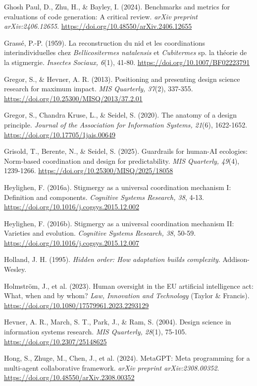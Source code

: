 Ghosh Paul, D., Zhu, H., \& Bayley, I. (2024). Benchmarks and metrics
for evaluations of code generation: A critical review. \emph{arXiv
preprint arXiv:2406.12655}.
\url{https://doi.org/10.48550/arXiv.2406.12655}

Grassé, P.-P. (1959). La reconstruction du nid et les coordinations
interindividuelles chez \emph{Bellicositermes natalensis} et
\emph{Cubitermes} sp. la théorie de la stigmergie. \emph{Insectes
Sociaux, 6}(1), 41-80. \url{https://doi.org/10.1007/BF02223791}

Gregor, S., \& Hevner, A. R. (2013). Positioning and presenting design
science research for maximum impact. \emph{MIS Quarterly, 37}(2),
337-355. \url{https://doi.org/10.25300/MISQ/2013/37.2.01}

Gregor, S., Chandra Kruse, L., \& Seidel, S. (2020). The anatomy of a
design principle. \emph{Journal of the Association for Information
Systems, 21}(6), 1622-1652.
\url{https://doi.org/10.17705/1jais.00649}

Grisold, T., Berente, N., \& Seidel, S. (2025). Guardrails for human-AI
ecologies: Norm-based coordination and design for predictability.
\emph{MIS Quarterly, 49}(4), 1239-1266.
\url{https://doi.org/10.25300/MISQ/2025/18058}

Heylighen, F. (2016a). Stigmergy as a universal coordination mechanism
I: Definition and components. \emph{Cognitive Systems Research, 38},
4-13. \url{https://doi.org/10.1016/j.cogsys.2015.12.002}

Heylighen, F. (2016b). Stigmergy as a universal coordination mechanism
II: Varieties and evolution. \emph{Cognitive Systems Research, 38},
50-59. \url{https://doi.org/10.1016/j.cogsys.2015.12.007}

Holland, J. H. (1995). \emph{Hidden order: How adaptation builds
complexity}. Addison-Wesley.

Holmström, J., et al. (2023). \textquotesingle Human
oversight\textquotesingle{} in the EU artificial intelligence act: What,
when and by whom? \emph{Law, Innovation and Technology} (Taylor \&
Francis). \url{https://doi.org/10.1080/17579961.2023.2293129}

Hevner, A. R., March, S. T., Park, J., \& Ram, S. (2004). Design
science in information systems research. \emph{MIS Quarterly, 28}(1),
75-105. \url{https://doi.org/10.2307/25148625}

Hong, S., Zhuge, M., Chen, J., et al. (2024). MetaGPT: Meta programming
for a multi-agent collaborative framework. \emph{arXiv preprint
arXiv:2308.00352}. \url{https://doi.org/10.48550/arXiv.2308.00352}

